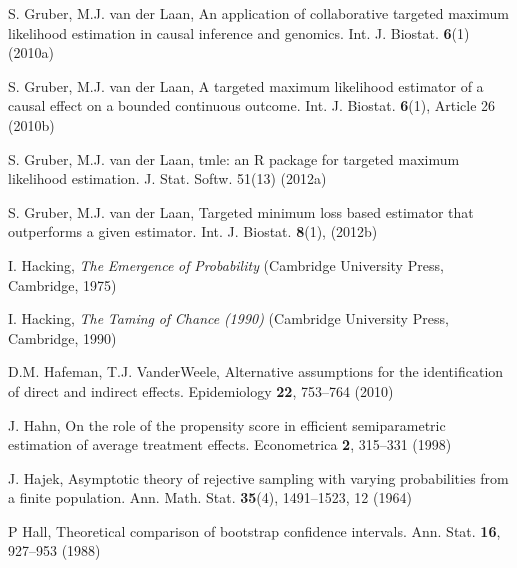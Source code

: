 \begin{list}{}{\setlength{\leftmargin}{2.1em}\setlength{\labelwidth}{0pt}
  \setlength{\labelsep}{0pt}\setlength{\itemindent}{-2.1em}
  \setlength{\parsep}{0pt}\setlength{\itemsep}{2pt}\setlength{\topsep}{0pt}}
\item\label{refentry:REF133}S. Gruber, M.J. van der Laan, An application of collaborative targeted maximum likelihood estimation in causal inference and genomics. Int. J. Biostat. \textbf{6}(1) (2010a)\label{refend:REF133}
\item\label{refentry:REF134}S. Gruber, M.J. van der Laan, A targeted maximum likelihood estimator of a causal effect on a bounded continuous outcome. Int. J. Biostat. \textbf{6}(1), Article 26 (2010b)\label{refend:REF134}
\item\label{refentry:REF135}S. Gruber, M.J. van der Laan, tmle: an R package for targeted maximum likelihood estimation. J. Stat. Softw. 51(13) (2012a)\label{refend:REF135}
\item\label{refentry:REF136}S. Gruber, M.J. van der Laan, Targeted minimum loss based estimator that outperforms a given estimator. Int. J. Biostat. \textbf{8}(1), (2012b)\label{refend:REF136}
\item\label{refentry:REF137}I. Hacking, \textit{The} \textit{Emergence} \textit{of} \textit{Probability} (Cambridge University Press, Cambridge, 1975)\label{refend:REF137}
\item\label{refentry:REF138}I. Hacking, \textit{The} \textit{Taming} \textit{of} \textit{Chance} \textit{(1990)} (Cambridge University Press, Cambridge, 1990)\label{refend:REF138}
\item\label{refentry:REF139}D.M. Hafeman, T.J. VanderWeele, Alternative assumptions for the identification of direct and indirect effects. Epidemiology \textbf{22}, 753--764 (2010)\label{refend:REF139}
\item\label{refentry:REF140}J. Hahn, On the role of the propensity score in efficient semiparametric estimation of average treatment effects. Econometrica \textbf{2}, 315--331 (1998)\label{refend:REF140}
\item\label{refentry:REF141}J. Hajek, Asymptotic theory of rejective sampling with varying probabilities from a finite population. Ann. Math. Stat. \textbf{35}(4), 1491--1523, 12 (1964)\label{refend:REF141}
\item\label{refentry:REF142}P Hall, Theoretical comparison of bootstrap confidence intervals. Ann. Stat. \textbf{16}, 927--953 (1988)\label{refend:REF142}

\end{list}
